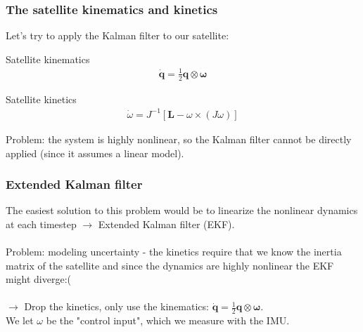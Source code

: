 \documentclass{beamer}
\begin{document}
\begin{frame}
    \frametitle{The satellite kinematics and kinetics}
    Let's try to apply the Kalman filter to our satellite:
    \begin{block}{Satellite kinematics}
        \begin{equation}
            \begin{aligned}
                \dot{\mathbf{q}}=\frac{1}{2} \mathbf{q} \otimes \boldsymbol{\omega}
            \end{aligned}
        \end{equation}
    \end{block}
    \begin{block}{Satellite kinetics}
        \begin{equation}
            \begin{aligned}
                \dot{\omega}=J^{-1}\left[\mathbf{L}-\omega \times\left(J \omega\right)\right]
            \end{aligned}
        \end{equation}
    \end{block}
    Problem: the system is highly nonlinear, so the Kalman filter cannot be directly applied (since it assumes a linear model).
\end{frame}


\begin{frame}
    \frametitle{Extended Kalman filter}
    The easiest solution to this problem would be to linearize the nonlinear dynamics at each timestep $\rightarrow$ Extended Kalman filter (EKF). \\~\\

    Problem: modeling uncertainty - the kinetics require that we know the inertia matrix of the satellite and since the dynamics are highly nonlinear the EKF might diverge:( \\~\\

    $\rightarrow$ Drop the kinetics, only use the kinematics: $\dot{\mathbf{q}}=\frac{1}{2} \mathbf{q} \otimes \boldsymbol{\omega}$. \\
    We let $\omega$ be the "control input", which we measure with the IMU. \\~\\
\end{frame}

\end{document}

